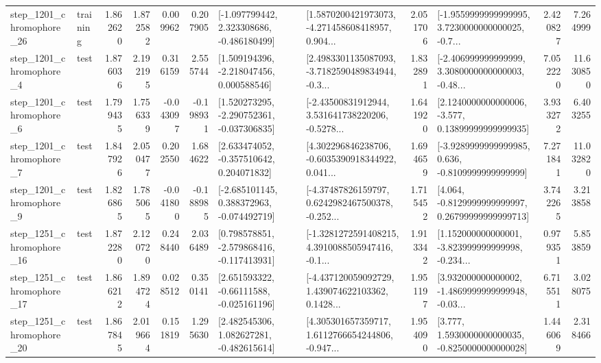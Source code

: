 \begin{tabular}{llrrrrllrlrr}
 step\_1201\_chromophore\_26 &  training &      1.862620 &    1.872582 &      0.009962 &  0.207905 &   [-1.097799442, 2.323308686, -0.486180499] &  [1.5870200421973073, -4.271458608418957, 0.904... &       2.051706 &  [-1.9559999999999995, 3.7230000000000025, -0.7... &            2.420827 &          7.264999 \\
  step\_1201\_chromophore\_4 &      test &      1.876036 &    2.192195 &      0.316159 &  2.555744 &    [1.509194396, -2.218047456, 0.000588546] &  [2.4983301135087093, -3.7182590489834944, -0.3... &       1.832891 &  [-2.406999999999999, 3.3080000000000003, -0.48... &            7.052220 &         11.630850 \\
  step\_1201\_chromophore\_6 &      test &      1.799435 &    1.756339 &     -0.043097 & -0.198931 &   [1.520273295, -2.290752361, -0.037306835] &  [-2.43500831912944, 3.531641738220206, -0.5278... &       1.641920 &  [2.1240000000000006, -3.577, 0.13899999999999935] &            3.933272 &          6.403255 \\
  step\_1201\_chromophore\_7 &      test &      1.847926 &    2.050477 &      0.202550 &  1.684622 &    [2.633474052, -0.357510642, 0.204071832] &  [4.302296846238706, -0.6035390918344922, 0.041... &       1.694659 &  [-3.9289999999999985, 0.636, -0.8109999999999999] &            7.271841 &         11.032820 \\
  step\_1201\_chromophore\_9 &      test &      1.826865 &    1.785065 &     -0.041800 & -0.188985 &   [-2.685101145, 0.388372963, -0.074492719] &  [-4.37487826159797, 0.6242982467500378, -0.252... &       1.715452 &  [4.064, -0.8129999999999997, 0.26799999999999713] &            3.742265 &          3.213858 \\
 step\_1251\_chromophore\_16 &      test &      1.872280 &    2.120720 &      0.248440 &  2.036489 &   [0.798578851, -2.579868416, -0.117413931] &  [-1.3281272591408215, 4.3910088505947416, -0.1... &       1.913342 &  [1.152000000000001, -3.823999999999998, -0.234... &            0.979351 &          5.853859 \\
 step\_1251\_chromophore\_17 &      test &      1.866212 &    1.894724 &      0.028512 &  0.350141 &    [2.651593322, -0.66111588, -0.025161196] &  [-4.437120059092729, 1.439074622103362, 0.1428... &       1.951197 &  [3.932000000000002, -1.4869999999999948, -0.03... &            6.715511 &          3.028075 \\
 step\_1251\_chromophore\_20 &      test &      1.867845 &    2.019664 &      0.151819 &  1.295630 &    [2.482545306, 1.082627281, -0.482615614] &  [4.305301657359717, 1.6112766654244806, -0.947... &       1.954090 &   [3.777, 1.5930000000000035, -0.8250000000000028] &            1.446069 &          2.318466 \\

\end{tabular}

